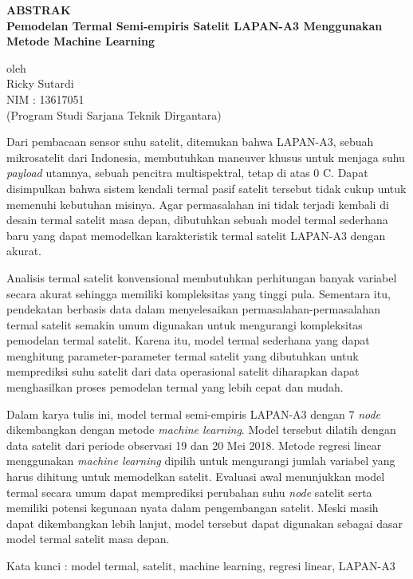 \begin{center}
       \Large
       \textbf{ABSTRAK} \\
        \vspace{1.5cm}
        \large
        \textbf{Pemodelan Termal Semi-empiris Satelit LAPAN-A3 Menggunakan Metode Machine Learning}\\
        
        \vspace{1.5cm}
        
        oleh\\
        Ricky Sutardi\\
        NIM : 13617051\\
        (Program Studi Sarjana Teknik Dirgantara)\\
        \vspace{1.5cm}
\end{center}

Dari pembacaan sensor suhu satelit, ditemukan bahwa LAPAN-A3, sebuah
mikrosatelit dari Indonesia, membutuhkan maneuver khusus untuk menjaga suhu
\textit{payload} utamnya, sebuah pencitra multispektral, tetap di atas 0
\degree C. Dapat disimpulkan bahwa sistem kendali termal pasif satelit tersebut
tidak cukup untuk memenuhi kebutuhan misinya. Agar permasalahan ini tidak
terjadi kembali di desain termal satelit masa depan, dibutuhkan sebuah model
termal sederhana baru yang dapat memodelkan karakteristik termal satelit
LAPAN-A3 dengan akurat.

Analisis termal satelit konvensional membutuhkan perhitungan banyak variabel
secara akurat sehingga memiliki kompleksitas yang tinggi pula. Sementara itu,
pendekatan berbasis data dalam menyelesaikan permasalahan-permasalahan termal
satelit semakin umum digunakan untuk mengurangi kompleksitas pemodelan termal
satelit. Karena itu, model termal sederhana yang dapat menghitung
parameter-parameter termal satelit yang dibutuhkan untuk memprediksi suhu
satelit dari data operasional satelit diharapkan dapat menghasilkan proses
pemodelan termal yang lebih cepat dan mudah.

Dalam karya tulis ini, model termal semi-empiris LAPAN-A3 dengan 7
\textit{node} dikembangkan dengan metode \textit{machine learning}. Model
tersebut dilatih dengan data satelit dari periode observasi 19 dan 20 Mei 2018.
Metode regresi linear menggunakan \textit{machine learning} dipilih untuk
mengurangi jumlah variabel yang harus dihitung untuk memodelkan satelit.
Evaluasi awal menunjukkan model termal secara umum dapat memprediksi perubahan
suhu \textit{node} satelit serta memiliki potensi kegunaan nyata dalam
pengembangan satelit. Meski masih dapat dikembangkan lebih lanjut, model
tersebut dapat digunakan sebagai dasar model termal satelit masa depan. 

\vspace{1.0cm}
\noindent 
Kata kunci : model termal, satelit, machine learning, regresi linear, LAPAN-A3
